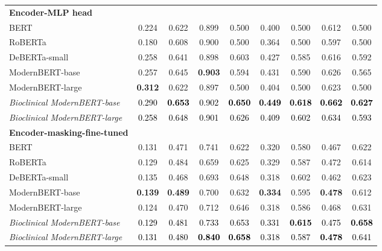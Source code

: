\begin{table}[!htbp]
{\begin{tabular}{lcccccccc}
\midrule
\textbf{Encoder-MLP head} &&&&&&&&\\
BERT & 0.224 & 0.622 & 0.899 & 0.500 & 0.400 & 0.500 & 0.612 & 0.500 \\
RoBERTa & 0.180 & 0.608 & 0.900 & 0.500 & 0.364 & 0.500 & 0.597 & 0.500 \\
DeBERTa-small & 0.258 & 0.641 & 0.898 & 0.603 & 0.427 & 0.585 & 0.616 & 0.592 \\
ModernBERT-base & 0.257 & 0.645 & \textbf{0.903} & 0.594 & 0.431 & 0.590 & 0.626 & 0.565 \\
ModernBERT-large & \textbf{0.312} & 0.622 & 0.897 & 0.500 & 0.404 & 0.500 & 0.623 & 0.500 \\
\textit{Bioclinical ModernBERT-base} & \textcolor{black}{0.290} & \textcolor{black}{\textbf{0.653}} & \textcolor{black}{0.902} & \textcolor{black}{\textbf{0.650}} & \textcolor{black}{\textbf{0.449}} & \textcolor{black}{\textbf{0.618}} & \textcolor{black}{\textbf{0.662}} & \textcolor{black}{\textbf{0.627}} \\
\textit{Bioclinical ModernBERT-large} & \textcolor{black}{0.258} & \textcolor{black}{0.648} & \textcolor{black}{0.901} & \textcolor{black}{0.626} & \textcolor{black}{0.409} & \textcolor{black}{0.602} & \textcolor{black}{0.634} & \textcolor{black}{0.593} \\
\midrule
\textbf{Encoder-masking-fine-tuned} &&&&&&&&\\
BERT & 0.131 & 0.471 & 0.741 & 0.622 & 0.320 & 0.580 & 0.467 & 0.622 \\
RoBERTa & 0.129 & 0.484 & 0.659 & 0.625 & 0.329 & 0.587 & 0.472 & 0.614 \\
DeBERTa-small & 0.135 & 0.468 & 0.693 & 0.648 & 0.318 & 0.602 & 0.462 & 0.623 \\
ModernBERT-base & \textbf{0.139} & \textbf{0.489} & 0.700 & 0.632 & \textbf{0.334} & 0.595 & \textbf{0.478} & 0.612 \\
ModernBERT-large & 0.124 & 0.470 & 0.712 & 0.646 & 0.318 & 0.586 & 0.468 & 0.631 \\
\textit{Bioclinical ModernBERT-base} & \textcolor{black}{0.129} & \textcolor{black}{0.481} & \textcolor{black}{0.733} & \textcolor{black}{0.653} & \textcolor{black}{0.331} & \textcolor{black}{\textbf{0.615}} & \textcolor{black}{0.475} & \textcolor{black}{\textbf{0.658}} \\
\textit{Bioclinical ModernBERT-large} & \textcolor{black}{0.131} & \textcolor{black}{0.480} & \textcolor{black}{\textbf{0.840}} & \textcolor{black}{\textbf{0.658}} & \textcolor{black}{0.318} & \textcolor{black}{0.587} & \textcolor{black}{\textbf{0.478}} & \textcolor{black}{0.641} \\

\end{tabular}}
\end{table}
